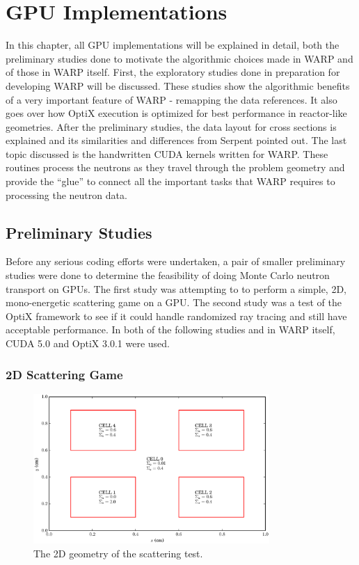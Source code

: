 \chapter{GPU Implementations}
\label{chap:imp}

In this chapter, all GPU implementations will be explained in detail, both the preliminary studies done to motivate the algorithmic choices made in WARP and of those in WARP itself.  First, the exploratory studies done in preparation for developing WARP will be discussed.  These studies show the algorithmic benefits of a very important feature of WARP - remapping the data references.  It also goes over how OptiX execution is optimized for best performance in reactor-like geometries.  After the preliminary studies, the data layout for cross sections is explained and its similarities and differences from Serpent pointed out.  The last topic discussed is the handwritten CUDA kernels written for WARP.  These routines process the neutrons as they travel through the problem geometry and provide the ``glue'' to connect all the important tasks that WARP requires to processing the neutron data.

\section{Preliminary Studies}
\label{sec:prelim}

Before any serious coding efforts were undertaken, a pair of smaller preliminary studies were done to determine the feasibility of doing Monte Carlo neutron transport on GPUs.  The first study was attempting to to perform a simple, 2D, mono-energetic scattering game on a GPU.  The second study was a test of the OptiX framework to see if it could handle randomized ray tracing and still have acceptable performance. In both of the following studies and in WARP itself, CUDA 5.0 and OptiX 3.0.1 were used.

\subsection{2D Scattering Game}

\begin{figure}[h!] 
  \centering
    \includegraphics[width=0.8\textwidth]{graphics/prelim_geom.eps}
     \caption{The 2D geometry of the scattering test. \label{prelim_geom} }
\end{figure}

